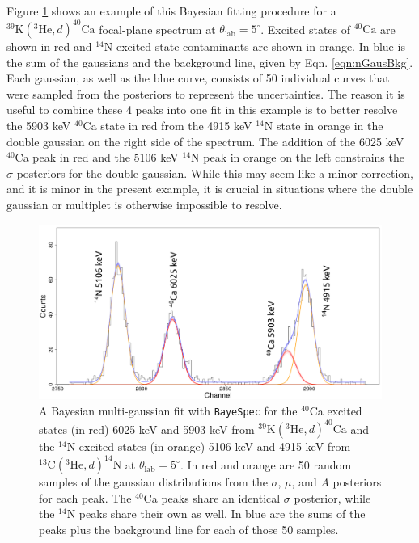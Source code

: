 Figure \ref{fig:Gaus_Bayesian} shows an example of this Bayesian fitting procedure for a $^{39}\mathrm{K}(^{3}\mathrm{He},d)^{40}\mathrm{Ca}$ focal-plane spectrum at $\theta_{\mathrm{lab}} = 5^{\circ}$. Excited states of $^{40}\mathrm{Ca}$ are shown in red and $^{14}\mathrm{N}$ excited state contaminants are shown in orange. In blue is the sum of the gaussians and the background line, given by Eqn. \ref{eqn:nGausBkg}. Each gaussian, as well as the blue curve, consists of 50 individual curves that were sampled from the posteriors to represent the uncertainties. The reason it is useful to combine these 4 peaks into one fit in this example is to better resolve the 5903 keV $^{40}$Ca state in red from the 4915 keV $^{14}$N state in orange in the double gaussian on the right side of the spectrum. The addition of the 6025 keV $^{40}$Ca peak in red and the 5106 keV $^{14}$N peak in orange on the left constrains the $\sigma$ posteriors for the double gaussian. While this may seem like a minor correction, and it is minor in the present example, it is crucial in situations where the double gaussian or multiplet is otherwise impossible to resolve.

\begin{figure}[t]
\centering
\includegraphics[width=6.5in]{Chapter-6/figs/Gaus_Bayesian.png}
\caption{\label{fig:Gaus_Bayesian}A Bayesian multi-gaussian fit with \texttt{BayeSpec} for the $^{40}$Ca excited states (in red) 6025 keV and 5903 keV from $^{39}\mathrm{K}(^{3}\mathrm{He},d)^{40}\mathrm{Ca}$ and the $^{14}$N excited states (in orange) 5106 keV and 4915 keV from $^{13}\mathrm{C}(^{3}\mathrm{He},d)^{14}\mathrm{N}$ at $\theta_{\mathrm{lab}} = 5^{\circ}$. In red and orange are 50 random samples of the gaussian distributions from the $\sigma$, $\mu$, and $A$ posteriors for each peak. The $^{40}$Ca peaks share an identical $\sigma$ posterior, while the $^{14}$N peaks share their own as well. In blue are the sums of the peaks plus the background line for each of those 50 samples.}
\end{figure}

